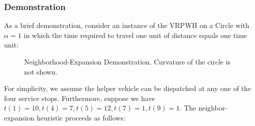 \documentclass[12pt]{scrartcl}
\begin{document}
\subsubsection{Demonstration}
As a brief demonstration, consider an instance of the VRPWH on a Circle with $\alpha = 1$ in which the time required to travel one unit of distance equals one time unit:

\begin{figure}[H]
  \centering
  \caption{Neighborhood-Expansion Demonstration. Curvature of the circle is not shown.}
\end{figure}

\noindent For simplicity, we assume the helper vehicle can be dispatched at any one of the four service stops. Furthermore, suppose we have $t(1) = 10, t(4) = 7, t(5) = 12, t(7) = 1, t(9) = 1$.  The neighbor-expansion heuristic proceeds as follows:
\end{document}
